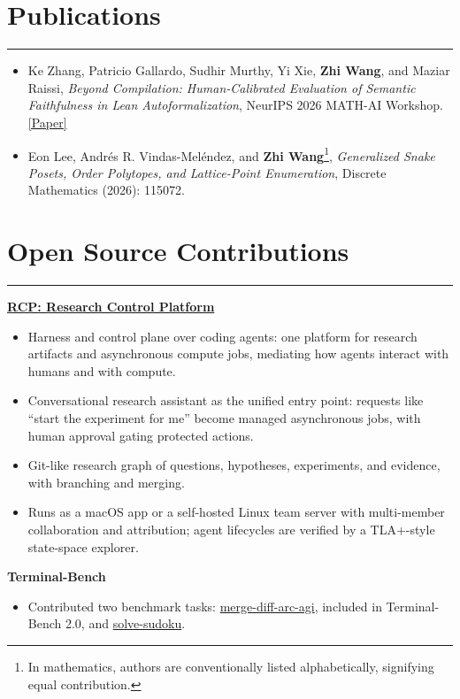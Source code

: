 \documentclass[11pt]{article}
\begin{document}
\section*{Publications}
\hrule
\begin{itemize}
    \item Ke Zhang, Patricio Gallardo, Sudhir Murthy, Yi Xie, \textbf{Zhi Wang}, and Maziar Raissi, \textit{Beyond Compilation: Human-Calibrated Evaluation of Semantic Faithfulness in Lean Autoformalization}, NeurIPS 2026 MATH-AI Workshop. \href{https://openreview.net/forum?id=NyhNnJEJgL}{[Paper]}
    \item Eon Lee, Andrés R. Vindas-Meléndez, and \textbf{Zhi Wang}\footnote{In mathematics, authors are conventionally listed alphabetically, signifying equal contribution.}, \textit{Generalized Snake Posets, Order Polytopes, and Lattice-Point Enumeration}, Discrete Mathematics (2026): 115072.
\end{itemize}

\section*{Open Source Contributions}
\hrule
\noindent
\textbf{\href{https://github.com/Zhi0467/RCP}{RCP: Research Control Platform}}\vspace{-\parskip}
\begin{itemize}[leftmargin=1.5em, topsep=0pt, partopsep=0pt, itemsep=0pt, parsep=0pt]
    \item Harness and control plane over coding agents: one platform for research artifacts and asynchronous compute jobs, mediating how agents interact with humans and with compute.
    \item Conversational research assistant as the unified entry point: requests like ``start the experiment for me'' become managed asynchronous jobs, with human approval gating protected actions.
    \item Git-like research graph of questions, hypotheses, experiments, and evidence, with branching and merging.
    \item Runs as a macOS app or a self-hosted Linux team server with multi-member collaboration and attribution; agent lifecycles are verified by a TLA+-style state-space explorer.
\end{itemize}

\noindent
\textbf{Terminal-Bench}\vspace{-\parskip}
\begin{itemize}[leftmargin=1.5em, topsep=0pt, partopsep=0pt, itemsep=0pt, parsep=0pt]
    \item Contributed two benchmark tasks: \href{https://github.com/laude-institute/terminal-bench/pull/724}{merge-diff-arc-agi}, included in Terminal-Bench 2.0, and \href{https://github.com/laude-institute/terminal-bench/pull/936}{solve-sudoku}.
\end{itemize}
\end{document}
